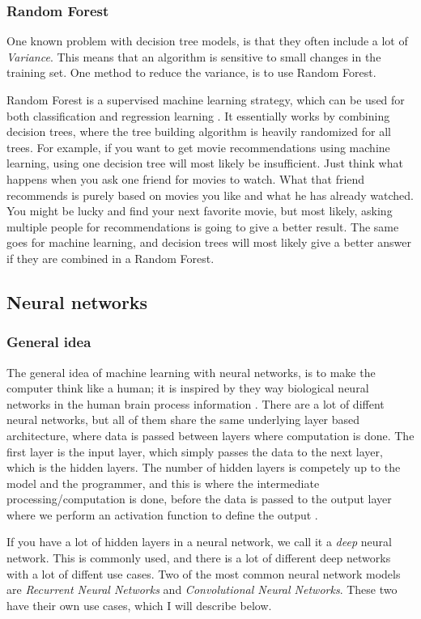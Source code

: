 \subsubsection{Random Forest}
One known problem with decision tree models, is that they often include a lot of \textit{Variance}. This means that an algorithm is sensitive to 
small changes in the training set. One method to reduce the variance, is to use Random Forest. 

Random Forest is a supervised machine learning strategy, which can be used for both classification and regression learning \cite{random_forest}. It essentially works
by combining decision trees, where the tree building algorithm is heavily randomized for all trees. For example, if you want to get movie recommendations
using machine learning, using one decision tree will most likely be insufficient. Just think what happens when you ask one friend for movies to watch.
What that friend recommends is purely based on movies you like and what he has already watched. You might be lucky and find your next favorite movie,
but most likely, asking multiple people for recommendations is going to give a better result. The same goes for machine learning, and decision trees 
will most likely give a better answer if they are combined in a Random Forest.

\subsection{Neural networks}
\subsubsection{General idea}
The general idea of machine learning with neural networks, is to make the computer think like a human; it is inspired by they way biological 
neural networks in the human brain process information \cite{neural_networks_0}. There are a lot of diffent neural networks, but all of them 
share the same underlying layer based architecture, where data is passed between layers where computation is done. The first layer is the input layer, 
which simply passes the data to the next layer, which is the hidden layers. The number of hidden layers is competely up to the model and the programmer, 
and this is where the intermediate processing/computation is done, before the data is passed to the output layer where we perform an activation function 
to define the output \cite{neural_networks_1}.

If you have a lot of hidden layers in a neural network, we call it a \textit{deep} neural network. This 
is commonly used, and there is a lot of different deep networks with a lot of diffent use cases. Two of the most common
neural network models are \textit{Recurrent Neural Networks} and \textit{Convolutional Neural Networks}. These two have their own use cases, 
which I will describe below.

